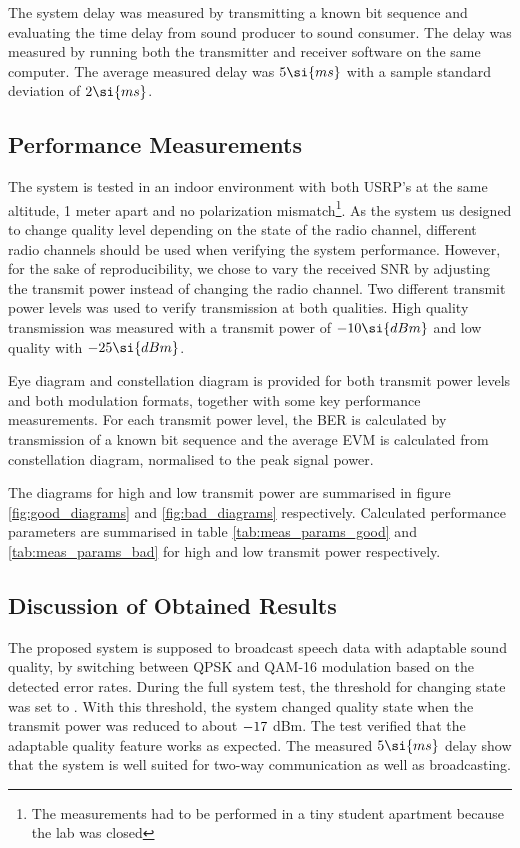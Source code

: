 The system delay was measured by transmitting a known bit sequence and evaluating the time delay from sound producer to sound consumer. The delay was measured by running both the transmitter and receiver software on the same computer. The average measured delay was $\measDelay \si{ms}$ with a sample standard deviation of $\measDelayStd \si{ms}$.  

\subsection{Performance Measurements}
\label{sec:perf_meas}
The system is tested in an indoor environment with both USRP's at the same altitude, 1 meter apart and no polarization mismatch\footnote{The measurements had to be performed in a tiny student apartment because the lab was closed}. As the system us designed to change quality level depending on the state of the radio channel, different radio channels should be used when verifying the system performance. However, for the sake of reproducibility, we chose to vary the received SNR by adjusting the transmit power instead of changing the radio channel. Two different transmit power levels was used to verify transmission at both qualities. High quality transmission was measured with a transmit power of $\measPWR \si{dBm}$ and low quality with $\measPWRbad \si{dBm}$. 

Eye diagram and constellation diagram is provided for both transmit power levels and both modulation formats, together with some key performance measurements. For each transmit power level, the BER is calculated by transmission of a known bit sequence and the average EVM is calculated from constellation diagram, normalised to the peak signal power. 

The diagrams for high and low transmit power are summarised in figure \ref{fig:good_diagrams} and \ref{fig:bad_diagrams} respectively. Calculated performance parameters are summarised in table \ref{tab:meas_params_good} and \ref{tab:meas_params_bad} for high and low transmit power respectively.






\subsection{Discussion of Obtained Results}
The proposed system is supposed to broadcast speech data with adaptable sound quality, by switching between QPSK and QAM-16 modulation based on the detected error rates. During the full system test, the threshold for changing state was set to \BERThreshold. With this threshold, the system changed quality state when the transmit power was reduced to about $-17$ dBm. The test verified that the adaptable quality feature works as expected. The measured $\measDelay \si{ms}$ delay show that the system is well suited for two-way communication as well as broadcasting. 

